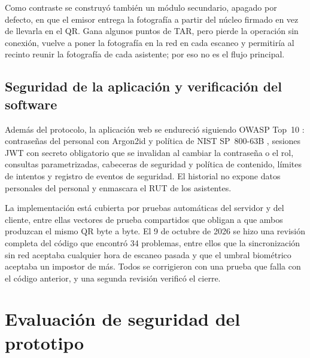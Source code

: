 Como contraste se construyó también un módulo secundario, apagado por defecto, en que el emisor
entrega la fotografía a partir del núcleo firmado en vez de llevarla en el QR. Gana algunos puntos
de TAR, pero pierde la operación sin conexión, vuelve a poner la fotografía en la red en cada
escaneo y permitiría al recinto reunir la fotografía de cada asistente; por eso no es el flujo
principal.

\subsection{Seguridad de la aplicación y verificación del software}
\label{sec:prototipo-software}

Además del protocolo, la aplicación web se endureció siguiendo OWASP Top~10 \cite{PENDIENTE-owasp}:
contraseñas del personal con Argon2id y política de NIST SP~800-63B \cite{PENDIENTE-nist80063b},
sesiones JWT con secreto obligatorio que se invalidan al cambiar la contraseña o el rol, consultas
parametrizadas, cabeceras de seguridad y política de contenido, límites de intentos y registro de
eventos de seguridad. El historial no expone datos personales del personal y enmascara el RUT de los
asistentes.

La implementación está cubierta por \TestsBackend{} pruebas automáticas del servidor y
\TestsFrontend{} del cliente, entre ellas vectores de prueba compartidos que obligan a que ambos
produzcan el mismo QR byte a byte. El 9 de octubre de 2026 se hizo una revisión completa del código
que encontró 34 problemas, entre ellos que la sincronización sin red aceptaba cualquier hora de
escaneo pasada y que el umbral biométrico aceptaba un impostor de más. Todos se corrigieron con una
prueba que falla con el código anterior, y una segunda revisión verificó el cierre.

\section{Evaluación de seguridad del prototipo}
\label{sec:prototipo-evaluacion}


